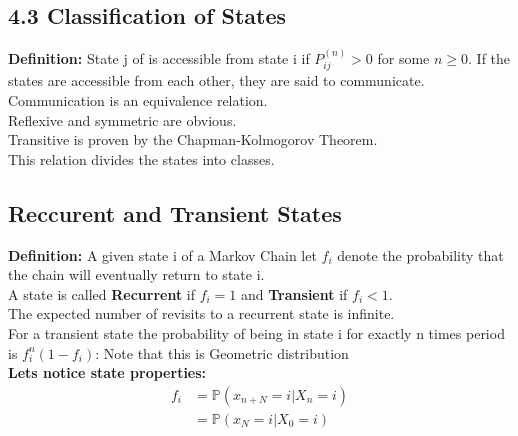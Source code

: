 \documentclass{article}
\newcommand{\prob}{\mathds{P}}
\begin{document}
\subsection*{4.3 Classification of States}
\textbf{Definition:} State j of is accessible from state i if $P_{ij}^{(n)} > 0$ for some $n \geq 0$. If the states are accessible from each other, they are said to communicate.\\
Communication is an equivalence relation.\\
Reflexive and symmetric are obvious.\\
Transitive is proven by the Chapman-Kolmogorov Theorem.\\
This relation divides the states into classes.\\
\subsection*{Reccurent and Transient States}
\textbf{Definition:} A given state i of a Markov Chain let $f_i$ denote the probability that the chain will eventually return to state i.\\
A state is called \textbf{Recurrent} if $f_i = 1$ and \textbf{Transient} if $f_i < 1$.\\
The expected number of revisits to a recurrent state is infinite.\\
For a transient state the probability of being in state i for exactly n times period is $f_i^n (1-f_i)$: Note that this is Geometric distribution\\
\textbf{Lets notice state properties:}\\
\begin{align*}
    f_i &= \prob(x_{n+N} =i | X_n = i)\\
    & = \prob(x_N = i | X_0 = i)
\end{align*}
\end{document}
